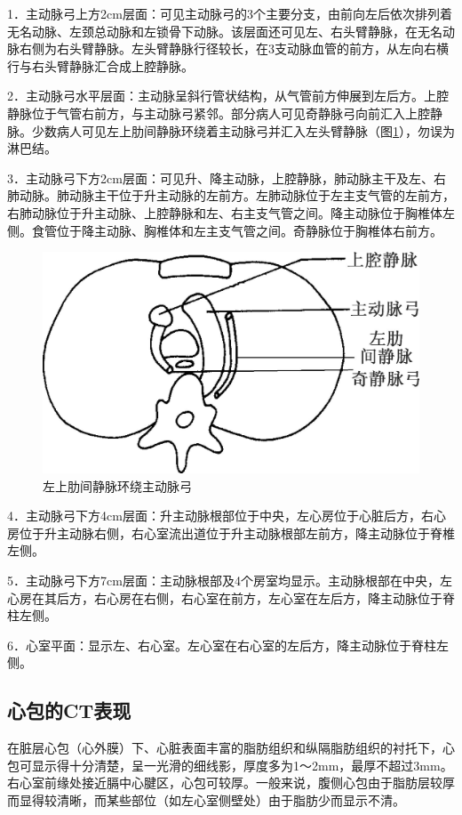 1．主动脉弓上方2cm层面：可见主动脉弓的3个主要分支，由前向左后依次排列着无名动脉、左颈总动脉和左锁骨下动脉。该层面还可见左、右头臂静脉，在无名动脉右侧为右头臂静脉。左头臂静脉行径较长，在3支动脉血管的前方，从左向右横行与右头臂静脉汇合成上腔静脉。

2．主动脉弓水平层面：主动脉呈斜行管状结构，从气管前方伸展到左后方。上腔静脉位于气管右前方，与主动脉弓紧邻。部分病人可见奇静脉弓向前汇入上腔静脉。少数病人可见左上肋间静脉环绕着主动脉弓并汇入左头臂静脉（图\ref{fig10-1}），勿误为淋巴结。

3．主动脉弓下方2cm层面：可见升、降主动脉，上腔静脉，肺动脉主干及左、右肺动脉。肺动脉主干位于升主动脉的左前方。左肺动脉位于左主支气管的左前方，右肺动脉位于升主动脉、上腔静脉和左、右主支气管之间。降主动脉位于胸椎体左侧。食管位于降主动脉、胸椎体和左主支气管之间。奇静脉位于胸椎体右前方。

\begin{figure}[!htbp]
 \centering
 \includegraphics[width=.7\textwidth,height=\textheight,keepaspectratio]{./images/Image00260.jpg}
 \captionsetup{justification=centering}
 \caption{左上肋间静脉环绕主动脉弓}
 \label{fig10-1}
  \end{figure} 

4．主动脉弓下方4cm层面：升主动脉根部位于中央，左心房位于心脏后方，右心房位于升主动脉右侧，右心室流出道位于升主动脉根部左前方，降主动脉位于脊椎左侧。

5．主动脉弓下方7cm层面：主动脉根部及4个房室均显示。主动脉根部在中央，左心房在其后方，右心房在右侧，右心室在前方，左心室在左后方，降主动脉位于脊柱左侧。

6．心室平面：显示左、右心室。左心室在右心室的左后方，降主动脉位于脊柱左侧。

\subsection{心包的CT表现}

在脏层心包（心外膜）下、心脏表面丰富的脂肪组织和纵隔脂肪组织的衬托下，心包可显示得十分清楚，呈一光滑的细线影，厚度多为1～2mm，最厚不超过3mm。右心室前缘处接近膈中心腱区，心包可较厚。一般来说，腹侧心包由于脂肪层较厚而显得较清晰，而某些部位（如左心室侧壁处）由于脂肪少而显示不清。

